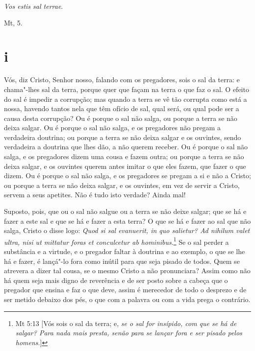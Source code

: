 \epigraph{\emph{Vos estis sal terrae}.\footnotemark}{Mt, 5.}

\section*{i}


\noindent{}Vós, diz Cristo, Senhor nosso, falando com os pregadores, sois o sal da
terra: e chama"-lhes sal da terra, porque quer que façam na terra o que
faz o sal. O efeito do sal é impedir a corrupção; mas quando a terra se
vê tão corrupta como está a nossa, havendo tantos nela que têm ofício de
sal, qual será, ou qual pode ser a causa desta corrupção? Ou é porque o
sal não salga, ou porque a terra se não deixa salgar. Ou é porque o sal
não salga, e os pregadores não pregam a verdadeira doutrina; ou porque a
terra se não deixa salgar e os ouvintes, sendo verdadeira a doutrina que
lhes dão, a não querem receber. Ou é porque o sal não salga, e os
pregadores dizem uma cousa e fazem outra; ou porque a terra se não deixa
salgar, e os ouvintes querem antes imitar o que eles fazem, que fazer o
que dizem. Ou é porque o sal não salga, e os pregadores se pregam a si e
não a Cristo; ou porque a terra se não deixa salgar, e os ouvintes, em
vez de servir a Cristo, servem a seus apetites. Não é tudo isto verdade?
Ainda mal!

Suposto, pois, que ou o sal não salgue ou a terra se não deixe salgar;
que se há e fazer a este sal e que se há e fazer a esta terra? O que se
há e fazer ao sal que não salga, Cristo o disse logo: \emph{Quod si sal
evanuerit, in quo salietur? Ad nihilum valet ultra, nisi ut mittatur
foras et conculcetur ab hominibus}.\footnote{Mt 5:13 [Vós sois o sal da terra; e, \emph{se o sal for insípido, com que se há de salgar? Para nada mais presta, senão para se lançar fora e ser pisado pelos homens}.]} Se o sal perder a substância e a
virtude, e o pregador faltar à doutrina e ao exemplo, o que se lhe há e
fazer, é lançá"-lo fora como inútil para que seja pisado de todos. Quem
se atrevera a dizer tal cousa, se o mesmo Cristo a não pronunciara?
Assim como não há quem seja mais digno de reverência e de ser posto
sobre a cabeça que o pregador que ensina e faz o que deve, assim é
merecedor de todo o desprezo e de ser metido debaixo dos pés, o que com
a palavra ou com a vida prega o contrário.

